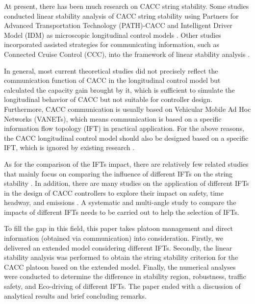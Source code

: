 \documentclass[journal]{IEEEtran}
\begin{document}
At present, there has been much research on CACC string stability. Some studies conducted linear stability analysis of CACC string stability using Partners for Advanced Transportation Technology (PATH)-CACC and Intelligent Driver Model (IDM) as microscopic longitudinal control models \citep{qin2021lighthill,zhou2021impact}. Other studies incorporated assisted strategies for communicating information, such as Connected Cruise Control (CCC), into the framework of linear stability analysis \citep{zhang2020control,navas2019mixing}.


In general, most current theoretical studies did not precisely reflect the communication function of CACC in the longitudinal control model but calculated the capacity gain brought by it, which is sufficient to simulate the longitudinal behavior of CACC but not suitable for controller design. Furthermore, CACC communication is usually based on Vehicular Mobile Ad Hoc Networks (VANETs), which means communication is based on a specific information flow topology (IFT) in practical application. For the above reasons, the CACC longitudinal control model should also be designed based on a specific IFT, which is ignored by existing research \citep{wang2020cooperative,li2020distributed,zhou2020smooth}.

As for the comparison of the IFTs impact, there are relatively few related studies that mainly focus on comparing the influence of different IFTs on the string stability \citep{zheng2015stability,zheng2017platooning}. In addition, there are many studies on the application of different IFTs in the design of CACC controllers to explore their impact on safety, time headway, and emissions \citep{bian2019reducing,liu2018modeling,yang2021cooperative}. A systematic and multi-angle study to compare the impacts of different IFTs needs to be carried out to help the selection of IFTs.

To fill the gap in this field, this paper takes platoon management and direct information (obtained via communication) into consideration. Firstly, we delivered an extended model considering different IFTs. Secondly, the linear stability analysis was performed to obtain the string stability criterion for the CACC platoon based on the extended model. Finally, the numerical analyses were conducted to determine the difference in stability region, robustness, traffic safety, and Eco-driving of different IFTs. The paper ended with a discussion of analytical results and brief concluding remarks.
\end{document}
